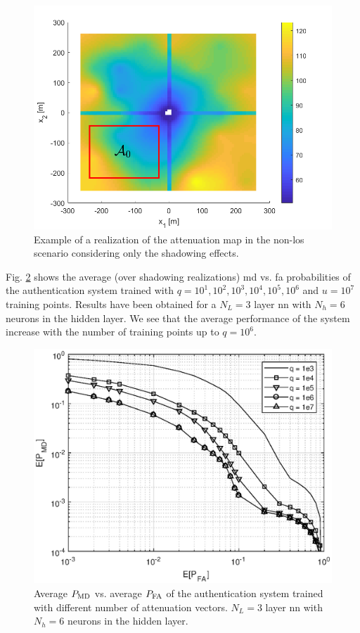 \documentclass[twocolumns]{IEEEtran}
\begin{document}
\begin{figure}[t]
    \centering
    \includegraphics[width=1\columnwidth]{surfColorato.png}
    \caption{Example of a realization of the attenuation map in the non-\ac{los} scenario considering only the shadowing effects.}
    \label{fig:trueMap}
\end{figure}

Fig. \ref{fig:n_train} shows the average (over shadowing realizations) \ac{md} vs. \ac{fa} probabilities of the authentication system trained with $q = 10^1, 10^2, 10^3, 10^4, 10^5, 10^6$ and $u=10^7$ training points. Results have been obtained for a $N_L=3$ layer \ac{nn} with $N_h=6$ neurons in the hidden layer. We see that the average performance of the system increase with the number of training points up to $q=10^6$.

\begin{figure}[t]
    \centering
    \includegraphics[width=1\columnwidth]{mean_maps.eps}
    \caption{Average $P_{\rm MD}$ vs. average $P_{\rm FA}$ of the authentication system trained with different number of attenuation vectors. $N_L=3$ layer \ac{nn} with $N_h=6$ neurons in the hidden layer.}
    \label{fig:n_train}
\end{figure}
\end{document}
